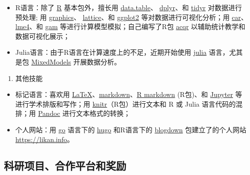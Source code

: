 \documentclass[12pt,]{article}
\providecommand{\tightlist}{%
  \setlength{\itemsep}{0pt}\setlength{\parskip}{0pt}}
\begin{document}
\begin{itemize}
\tightlist
\item
  R语言：除了 \href{https://www.r-project.org}{R} 基本包外，擅长用
  \href{http://r-datatable.com}{data.table}、
  \href{https://cran.r-project.org/web/packages/dplyr/index.html}{dplyr}、和
  \href{https://cran.r-project.org/web/packages/tidyr/index.html}{tidyr}
  对数据进行预处理; 用
  \href{https://stat.ethz.ch/R-manual/R-devel/library/graphics/html/00Index.html}{graphics}、
  \href{https://cran.r-project.org/package=lattice}{lattice}、和
  \href{http://ggplot2.tidyverse.org}{ggplot2}
  等对数据进行可视化分析；用
  \href{https://cran.r-project.org/web/packages/car/index.html}{car}、\href{https://github.com/lme4/lme4}{lme4}、和
  \href{https://cran.r-project.org/web/packages/gam/index.html}{gam}
  等进行计算模型模拟；自己编写了R包
  \href{https://github.com/likanzhan/acqr}{acqr}
  以辅助统计教学和数据可视化展示；
\item
  Julia语言：由于R语言在计算速度上的不足，近期开始使用
  \href{https://julialang.org}{julia} 语言，尤其是包
  \href{https://github.com/dmbates/MixedModels.jl}{MixedModels}
  开展数据分析。
\end{itemize}

\begin{enumerate}
\def\labelenumi{\arabic{enumi}.}
\setcounter{enumi}{2}
\tightlist
\item
  其他技能
\end{enumerate}

\begin{itemize}
\tightlist
\item
  标记语言：喜欢用
  \href{https://www.latex-project.org}{LaTeX}、\href{https://daringfireball.net/projects/markdown/}{markdown}、\href{https://rmarkdown.rstudio.com}{R
  markdown} (R包)、和 \href{https://jupyter.org}{Jupyter}
  等进行学术排版和写作；用
  \href{https://cran.r-project.org/web/packages/knitr/index.html}{knitr}（R包）进行文本和
  R 或 Julia 语言代码的混排；用 \href{https://pandoc.org}{Pandoc}
  进行文本格式的转换；
\item
  个人网站：用 \href{https://golang.org}{go} 语言下的
  \href{https://gohugo.io}{hugo} 和R语言下的
  \href{https://github.com/rstudio/blogdown}{blogdown}
  包建立了的个人网站 \url{https://likan.info}。
\end{itemize}

\hypertarget{ux79d1ux7814ux9879ux76eeux5408ux4f5cux5e73ux53f0ux548cux5956ux52b1}{%
\subsection{科研项目、合作平台和奖励}\label{ux79d1ux7814ux9879ux76eeux5408ux4f5cux5e73ux53f0ux548cux5956ux52b1}}
\end{document}
